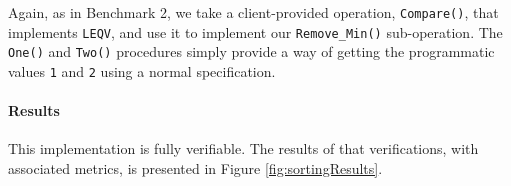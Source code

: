 

Again, as in Benchmark 2, we take a client-provided operation, \texttt{Compare()}, that implements \texttt{LEQV}, and use it to implement our \texttt{Remove\_Min()} sub-operation.  The \texttt{One()} and \texttt{Two()} procedures simply provide a way of getting the programmatic values \texttt{1} and \texttt{2} using a normal specification.

\paragraph{Results}This implementation is fully verifiable.  The results of that verifications, with associated metrics, is presented in Figure \ref{fig:sortingResults}.

